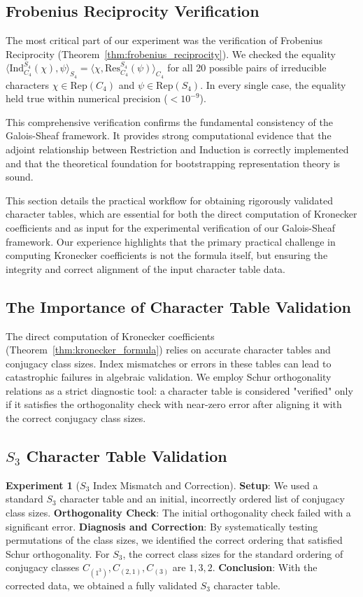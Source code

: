 \documentclass[11pt]{article}
\theoremstyle{definition}
\newtheorem{experiment}[theorem]{Experiment}
\theoremstyle{remark}
\begin{document}
\subsection{Frobenius Reciprocity Verification}
The most critical part of our experiment was the verification of Frobenius Reciprocity (Theorem~\ref{thm:frobenius_reciprocity}). We checked the equality $\langle \text{Ind}^{S_4}_{C_4}(\chi), \psi \rangle_{S_4} = \langle \chi, \text{Res}^{S_4}_{C_4}(\psi) \rangle_{C_4}$ for all 20 possible pairs of irreducible characters $\chi \in \text{Rep}(C_4)$ and $\psi \in \text{Rep}(S_4)$. In every single case, the equality held true within numerical precision ($< 10^{-9}$).

This comprehensive verification confirms the fundamental consistency of the Galois-Sheaf framework. It provides strong computational evidence that the adjoint relationship between Restriction and Induction is correctly implemented and that the theoretical foundation for bootstrapping representation theory is sound.

This section details the practical workflow for obtaining rigorously validated character tables, which are essential for both the direct computation of Kronecker coefficients and as input for the experimental verification of our Galois-Sheaf framework. Our experience highlights that the primary practical challenge in computing Kronecker coefficients is not the formula itself, but ensuring the integrity and correct alignment of the input character table data.

\subsection{The Importance of Character Table Validation}
The direct computation of Kronecker coefficients (Theorem~\ref{thm:kronecker_formula}) relies on accurate character tables and conjugacy class sizes. Index mismatches or errors in these tables can lead to catastrophic failures in algebraic validation. We employ Schur orthogonality relations as a strict diagnostic tool: a character table is considered "verified" only if it satisfies the orthogonality check with near-zero error after aligning it with the correct conjugacy class sizes.

\subsection{$S_3$ Character Table Validation}

\begin{experiment}[$S_3$ Index Mismatch and Correction]\label{exp:s3}
\textbf{Setup}: We used a standard $S_3$ character table and an initial, incorrectly ordered list of conjugacy class sizes.
\textbf{Orthogonality Check}: The initial orthogonality check failed with a significant error.
\textbf{Diagnosis and Correction}: By systematically testing permutations of the class sizes, we identified the correct ordering that satisfied Schur orthogonality. For $S_3$, the correct class sizes for the standard ordering of conjugacy classes $C_{(1^3)}, C_{(2,1)}, C_{(3)}$ are $1, 3, 2$.
\textbf{Conclusion}: With the corrected data, we obtained a fully validated $S_3$ character table.
\end{experiment}
\end{document}
